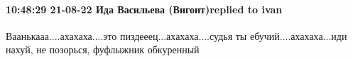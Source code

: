  
 
 
 
 

\paragraph{10:48:29 21-08-22 Ида Васильева (Вигонт)replied to ivan}

Ваанькааа....ахахаха....это пиздееец...ахахаха....судья ты
ебучий....ахахаха...иди нахуй, не позорься, фуфлыжник обкуренный🤣🤣🤣🤣🤣
